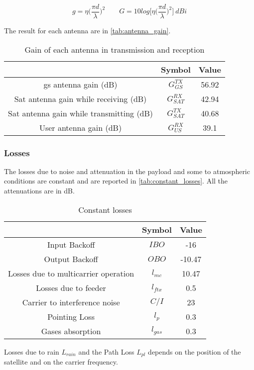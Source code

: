 		\begin{equation}\label{eq:gain}
			g = \eta\bigg(\frac{\pi d}{\lambda}\bigg)^2 \qquad G = 10log\bigg[\eta\bigg(\frac{\pi d}{\lambda}\bigg)^2\bigg] ~dBi
		\end{equation}

		The result for each antenna are in \autoref{tab:antenna_gain}.

		\begin{table}[h]
			\centering
			\begin{tabular}{ccc}
			\toprule
			& Symbol & Value\\
			\midrule
			\gls{gs} antenna gain (dB) & $G_{GS}^{TX}$ & 56.92\\
			Sat antenna gain while receiving (dB) & $G_{SAT}^{RX}$  & 42.94\\
			Sat antenna gain while transmitting (dB) & $G_{SAT}^{TX}$ & 40.68\\
			User antenna gain (dB) & $G_{US}^{RX}$ & 39.1\\
			\bottomrule
			\end{tabular}
			\caption{Gain of each antenna in transmission and reception}
			\label{tab:antenna_gain}
		\end{table}

	\subsubsection{Losses}
		The losses due to noise and attenuation in the payload and some to atmospheric conditions are constant and are reported in \autoref{tab:constant_losses}. All the attenuations are in dB.

		\begin{table}[h]
			\centering
			\begin{tabular}{ccc}
			\toprule
			& Symbol & Value\\
			\midrule
			Input Backoff & $IBO$ & -16\\
			Output Backoff & $OBO$ & -10.47\\
			Losses due to multicarrier operation & $l_{mc}$ & 10.47\\
			Losses due to feeder & $l_{ftx}$  & 0.5\\
			Carrier to interference noise & $C/I$  & 23\\
			Pointing Loss & $l_p$ & 0.3\\
			Gases absorption & $l_{gas}$ & 0.3\\
			\bottomrule
			\end{tabular}
			\caption{Constant losses}
			\label{tab:constant_losses}
		\end{table}
		Losses due to rain $L_{rain}$ and the Path Loss $L_{pl}$ depends on the position of the satellite and on the carrier frequency.

